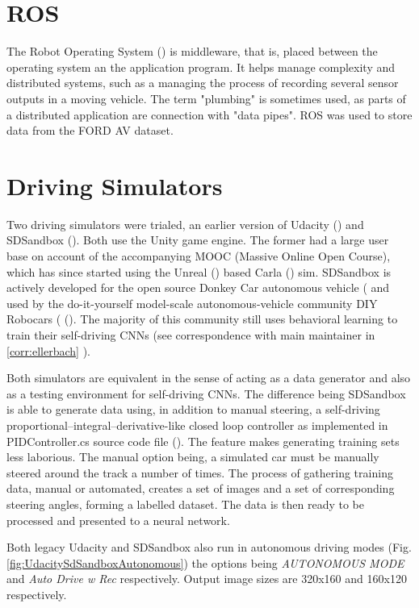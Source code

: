 \section{ROS}
The Robot Operating System (\cite{quigley2009ros}) is middleware, that is, placed between the operating system an the application program. It helps manage complexity and distributed systems, such as a managing the process of recording several sensor outputs in a moving vehicle. The term "plumbing" is sometimes used, as parts of a distributed application are connection with "data pipes".  
ROS was used to store data from the FORD AV dataset.


\section{Driving Simulators}

Two driving simulators were trialed, an earlier version of Udacity (\cite{UdacityCarSim}) and SDSandbox (\cite{SDSandboxSim}). Both use the Unity game engine. The former had a large user base on account of the accompanying MOOC (Massive Online Open Course), which has since started using the Unreal (\cite{unrealengine}) based Carla (\cite{Dosovitskiy17}) sim. SDSandbox is actively developed for the open source Donkey Car autonomous vehicle (\cite{DonkeyCar2020} and used by the do-it-yourself model-scale autonomous-vehicle community DIY Robocars (\cite{DIYRobocars2020} (\cite{DIYRobocars2020}). The majority of this community still uses behavioral learning to train their self-driving CNNs (see correspondence with main maintainer in \ref{corr:ellerbach}
).  
 
Both simulators are equivalent in the sense of acting as a data generator and also as a testing environment for self-driving CNNs. The difference being SDSandbox is able to generate data using, in addition to manual steering, a self-driving proportional–integral–derivative-like closed loop controller as implemented in PIDController.cs source code file (\cite{SDSandboxSim}). The feature makes generating training sets less laborious. The manual option being, a simulated car must be manually steered around the track a number of times. The process of gathering training data, manual or automated, creates a set of images and a set of corresponding steering angles, forming a labelled dataset.
The data is then ready to be processed and presented to a neural network.

Both legacy Udacity and SDSandbox also run in autonomous driving modes (Fig. \ref{fig:UdacitySdSandboxAutonomous}) the options being \textit{AUTONOMOUS MODE} and \textit{Auto Drive w Rec} respectively. Output image sizes are 320x160 and 160x120 respectively.


